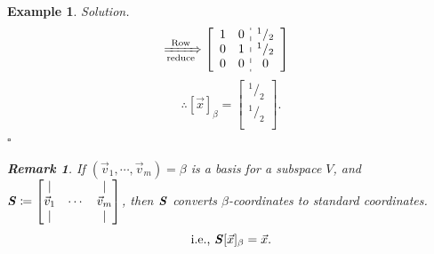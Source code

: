 \documentclass[12pt, a4paper]{article}
\newtheorem{eg}{Example}[subsection]
\newenvironment*{sol}{\indent\textit{Solution. }}{\hfill{$\square$}\par}
\newtheorem*{rmk}{\indent Remark}
\def\vecx{\vec{x}}
\def\vecv{\vec{v}}
\def\matrixS{\textbf{\emph{S}}}
\begin{document}
\begin{eg}
\begin{sol}
$$\begin{aligned}
			&\xRightarrow[\text{reduce}]{\text{Row}}\left[\begin{array}{c:c}\begin{matrix}1&0\\0&1\\0&0\end{matrix}&\begin{matrix}^1/_2\\^1/_2\\0\end{matrix}\end{array}\right]
		\end{aligned}$$
		\[\therefore[\vecx]_\beta=\begin{bmatrix}^1/_2\\^1/_2\\\end{bmatrix}.\]
	\end{sol}
	\begin{rmk} If $(\vecv_1,\cdots,\vecv_m)=\beta$ is a basis for a subspace $V$, and $\matrixS\coloneqq\begin{bmatrix}|&&|\\\vecv_1&\cdots&\vecv_m\\|&&|\end{bmatrix}$, then $\matrixS$ converts $\beta$-coordinates to standard coordinates. \[\text{i.e., }\matrixS[\vecx]_\beta=\vecx.\]
	\end{rmk}
\end{eg}
\end{document}
